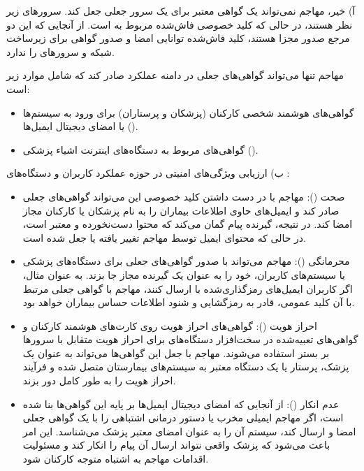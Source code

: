 
{آ)} خیر، مهاجم نمی‌تواند یک گواهی معتبر برای یک سرور جعلی  جعل کند. سرورهای  زیر نظر  هستند، در حالی که کلید خصوصی فاش‌شده مربوط به  است. از آنجایی که این دو مرجع صدور مجزا هستند، کلید فاش‌شده توانایی امضا و صدور گواهی برای زیرساخت شبکه و سرورهای  را ندارد.

مهاجم تنها می‌تواند گواهی‌های جعلی در دامنه عملکرد  صادر کند که شامل موارد زیر است:
\begin{itemize}
    \item گواهی‌های هوشمند شخصی کارکنان (پزشکان و پرستاران) برای ورود به سیستم‌ها یا امضای دیجیتال ایمیل‌ها ().
    \item گواهی‌های مربوط به دستگاه‌های اینترنت اشیاء پزشکی ().
\end{itemize}

{ب)} ارزیابی ویژگی‌های امنیتی در حوزه عملکرد کاربران و دستگاه‌های :
\begin{itemize}
    \item {صحت ():} مهاجم با در دست داشتن کلید خصوصی این  می‌تواند گواهی‌های جعلی  صادر کند و ایمیل‌های حاوی اطلاعات بیماران را به نام پزشکان یا کارکنان مجاز امضا کند. در نتیجه، گیرنده پیام گمان می‌کند که محتوا دست‌نخورده و معتبر است، در حالی که محتوای ایمیل توسط مهاجم تغییر یافته یا جعل شده است.
    \item {محرمانگی ():} مهاجم می‌تواند با صدور گواهی‌های جعلی برای دستگاه‌های  پزشکی یا سیستم‌های کاربران، خود را به عنوان یک گیرنده مجاز جا بزند. به عنوان مثال، اگر کاربران ایمیل‌های رمزگذاری‌شده با  ارسال کنند، مهاجم با گواهی جعلی مرتبط با آن کلید عمومی، قادر به رمزگشایی و شنود اطلاعات حساس بیماران خواهد بود.
    \item {احراز هویت ():} گواهی‌های احراز هویت روی کارت‌های هوشمند کارکنان و گواهی‌های تعبیه‌شده در سخت‌افزار دستگاه‌های  برای احراز هویت متقابل با سرورها بر بستر  استفاده می‌شوند. مهاجم با جعل این گواهی‌ها می‌تواند به عنوان یک پزشک، پرستار یا یک دستگاه  معتبر به سیستم‌های بیمارستان متصل شده و فرآیند احراز هویت را به طور کامل دور بزند.
    \item {عدم انکار ():} از آنجایی که امضای دیجیتال ایمیل‌ها بر پایه این گواهی‌ها بنا شده است، اگر مهاجم ایمیلی مخرب یا دستور درمانی اشتباهی را با یک گواهی جعلی امضا و ارسال کند، سیستم آن را به عنوان امضای معتبر پزشک می‌شناسد. این امر باعث می‌شود که پزشک واقعی نتواند ارسال آن پیام را انکار کند و مسئولیت اقدامات مهاجم به اشتباه متوجه کارکنان شود.
\end{itemize}

